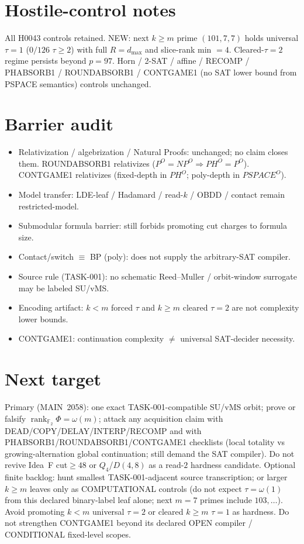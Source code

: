 \documentclass[11pt]{article}
\begin{document}
\section*{Hostile-control notes}
All H0043 controls retained. NEW: next $k{\ge}m$ prime $(101,7,7)$ holds universal
$\tau{=}1$ ($0/126$ $\tau{\ge}2$) with full $R{=}d_{\max}$ and slice-rank min $=4$.
Cleared-$\tau{=}2$ regime persists beyond $p{=}97$. Horn / 2-SAT / affine /
RECOMP / PHABSORB1 / ROUNDABSORB1 / CONTGAME1 (no SAT lower bound from PSPACE semantics)
controls unchanged.

\section*{Barrier audit}
\begin{itemize}
\item Relativization / algebrization / Natural Proofs: unchanged; no claim closes them.
  ROUNDABSORB1 relativizes ($P^O{=}NP^O\Rightarrow PH^O{=}P^O$).
  CONTGAME1 relativizes (fixed-depth in $PH^O$; poly-depth in $PSPACE^O$).
\item Model transfer: LDE-leaf / Hadamard / read-$k$ / OBDD / contact remain restricted-model.
\item Submodular formula barrier: still forbids promoting cut charges to formula size.
\item Contact/switch $\equiv$ BP (poly): does not supply the arbitrary-SAT compiler.
\item Source rule (TASK-001): no schematic Reed--Muller / orbit-window surrogate may be labeled SU/vMS.
\item Encoding artifact: $k{<}m$ forced $\tau$ and $k{\ge}m$ cleared $\tau{=}2$ are not complexity lower bounds.
\item CONTGAME1: continuation complexity $\neq$ universal SAT-decider necessity.
\end{itemize}

\section*{Next target}
Primary (MAIN~2058): one exact TASK-001-compatible SU/vMS orbit; prove or falsify
$\operatorname{rank}_{\mathbb F_2}\Phi=\omega(m)$; attack any acquisition claim with
DEAD/COPY/DELAY/INTERP/RECOMP and with PHABSORB1/ROUNDABSORB1/CONTGAME1 checklists
(local totality vs growing-alternation global continuation; still demand the SAT compiler).
Do not revive Idea~F cut$\ge48$ or $Q_4$/$D(4,8)$ as a read-$2$ hardness candidate.
Optional finite backlog: hunt smallest TASK-001-adjacent source transcription;
or larger $k{\ge}m$ leaves only as COMPUTATIONAL controls (do not expect $\tau=\omega(1)$
from this declared binary-label leaf alone; next $m{=}7$ primes include $103,\ldots$).
Avoid promoting $k{<}m$ universal $\tau{=}2$ or cleared $k{\ge}m$ $\tau{=}1$ as hardness.
Do not strengthen CONTGAME1 beyond its declared OPEN compiler / CONDITIONAL fixed-level scopes.
\end{document}
